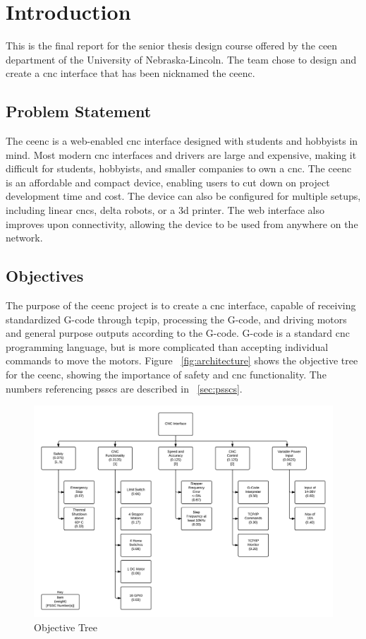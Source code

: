 \chapter{Introduction}
This is the final report for the senior thesis design course offered by the \gls{ceen} department of the University of Nebraska-Lincoln.
The team chose to design and create a \gls{cnc} interface that has been nicknamed the \gls{ceenc}.

\section{Problem Statement}
The \gls{ceenc} is a web-enabled \gls{cnc} interface designed with students and hobbyists in mind.
Most modern \gls{cnc} interfaces and drivers are large and expensive, making it difficult for students, hobbyists, and smaller companies to own a \gls{cnc}.
The \gls{ceenc} is an affordable and compact device, enabling users to cut down on project development time and cost.
The device can also be configured for multiple setups, including linear \gls{cnc}s, delta robots, or a \gls{3d} printer.
The web interface also improves upon connectivity, allowing the device to be used from anywhere on the network.

\section{Objectives}
The purpose of the \gls{ceenc} project is to create a \gls{cnc} interface, capable of receiving standardized G-code through	 \gls{tcpip}, processing the G-code, and driving motors and general purpose outputs according to the G-code.
G-code is a standard \gls{cnc} programming language, but is more complicated than accepting individual commands to move the motors.
Figure ~\ref{fig:architecture} shows the objective tree for the \gls{ceenc}, showing the importance of safety and \gls{cnc} functionality.
The numbers referencing \gls{pssc}s are described in ~\ref{sec:psscs}.

\begin{figure}[h]
	\centering
	\includegraphics[width=1\textwidth]{objective-tree.png}
	\caption{Objective Tree}
	\label{fig:o-tree}
\end{figure}

